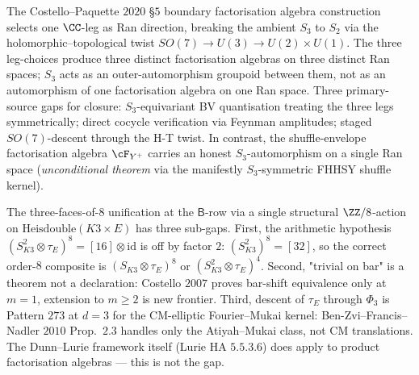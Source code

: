 \begin{remark}
\label{wn:frontier:wave3-CP-S3}\ClaimStatusOpen
The Costello--Paquette $2020$ \S$5$ boundary factorisation algebra
construction selects one $\CC$-leg as Ran direction, breaking the
ambient $S_3$ to $S_2$ via the holomorphic--topological twist
$SO(7) \to U(3) \to U(2) \times U(1)$. The three leg-choices produce
three distinct factorisation algebras on three distinct Ran spaces;
$S_3$ acts as an outer-automorphism groupoid between them, not as an
automorphism of one factorisation algebra on one Ran space. Three
primary-source gaps for closure: $S_3$-equivariant BV quantisation
treating the three legs symmetrically; direct cocycle verification via
Feynman amplitudes; staged $SO(7)$-descent through the H-T twist.
In contrast, the shuffle-envelope factorisation algebra
$\cF_{Y^+}$ carries an honest $S_3$-automorphism on a single Ran space
(\emph{unconditional theorem} via the manifestly $S_3$-symmetric
FHHSY shuffle kernel).
\end{remark}

\begin{remark}
\label{wn:frontier:wave3-Dunn-Lurie-Serre}\ClaimStatusOpen
The three-faces-of-$8$ unification at the $\mathsf{B}$-row via a single
structural $\ZZ/8$-action on $\mathrm{Heisdouble}(K3 \times E)$ has
three sub-gaps. First, the arithmetic hypothesis
$(S_{K3}^2 \otimes \tau_E)^8 = [16] \otimes \mathrm{id}$ is off by
factor $2$: $(S_{K3}^2)^8 = [32]$, so the correct order-$8$ composite
is $(S_{K3} \otimes \tau_E)^8$ or $(S_{K3}^2 \otimes \tau_E)^4$.
Second, "trivial on bar" is a theorem not a declaration: Costello
$2007$ proves bar-shift equivalence only at $m = 1$, extension to
$m \geq 2$ is new frontier. Third, descent of $\tau_E$ through
$\Phi_3$ is Pattern $273$ at $d = 3$ for the CM-elliptic Fourier--Mukai
kernel: Ben-Zvi--Francis--Nadler $2010$ Prop.~$2.3$ handles only the
Atiyah--Mukai class, not CM translations. The Dunn--Lurie framework
itself (Lurie HA $5.5.3.6$) does apply to product factorisation
algebras — this is not the gap.
\end{remark}

